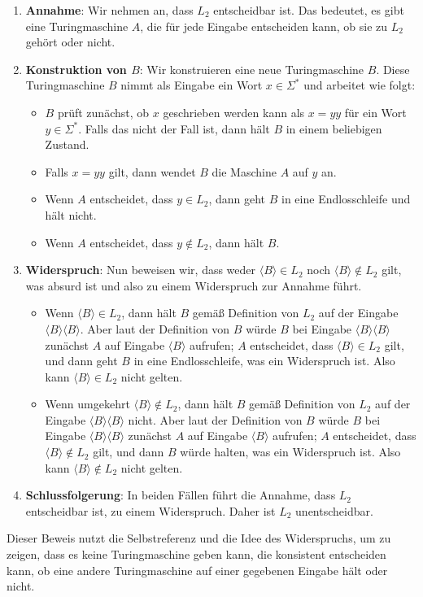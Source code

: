 \documentclass[a4paper,11pt,oneside,ngerman]{scrartcl}
\begin{document}
\begin{enumerate}
    \item \textbf{Annahme}: Wir nehmen an, dass \( L_2 \) entscheidbar ist. Das bedeutet, es gibt eine Turingmaschine \( A \), die für jede Eingabe entscheiden kann, ob sie zu \( L_2 \) gehört oder nicht.
    
    \item \textbf{Konstruktion von \( B \)}: Wir konstruieren eine neue Turingmaschine \( B \). Diese Turingmaschine \( B \) nimmt als Eingabe ein Wort $x\in\Sigma^\ast$ und arbeitet wie folgt:
    \begin{itemize}
        \item \(B\) prüft zunächst, ob \(x\) geschrieben werden kann als \(x=yy\) für ein Wort \(y\in\Sigma^\ast\). Falls das nicht der Fall ist, dann hält \(B\) in einem beliebigen Zustand.
        \item Falls \(x=yy\) gilt, dann wendet \( B \) die Maschine \( A \) auf \( y \) an.
        \item Wenn \( A \) entscheidet, dass \( y \in L_2 \), dann geht \( B \) in eine Endlosschleife und hält nicht.
        \item Wenn \( A \) entscheidet, dass \( y \notin L_2 \), dann hält \( B \).
    \end{itemize}
    
    \item \textbf{Widerspruch}: Nun beweisen wir, dass weder \( \langle B \rangle\in L_2 \) noch \( \langle B \rangle\not\in L_2 \) gilt, was absurd ist und also zu einem Widerspruch zur Annahme führt.
    \begin{itemize}
        \item Wenn \( \langle B \rangle \in L_2 \), dann hält \( B \) gemäß Definition von \(L_2\) auf der Eingabe \( \langle B \rangle\langle B \rangle \). Aber laut der Definition von \( B \) würde \(B\) bei Eingabe \(\langle B \rangle\langle B \rangle\) zunächst \(A\) auf Eingabe \(\langle B \rangle\) aufrufen; \(A\) entscheidet, dass \(\langle B \rangle\in L_2\) gilt, und dann geht \(B\) in eine Endlosschleife, was ein Widerspruch ist. Also kann \( \langle B \rangle \in L_2 \) nicht gelten.
        \item Wenn umgekehrt \( \langle B \rangle \notin L_2 \), dann hält \( B \) gemäß Definition von \(L_2\) auf der Eingabe \( \langle B \rangle\langle B \rangle \) nicht. Aber laut der Definition von \( B \) würde \(B\) bei Eingabe \(\langle B \rangle\langle B \rangle\) zunächst \(A\) auf Eingabe \(\langle B \rangle\) aufrufen; \(A\) entscheidet, dass \(\langle B \rangle\not\in L_2\) gilt, und dann \(B\) würde halten, was ein Widerspruch ist. Also kann \( \langle B \rangle \not\in L_2 \) nicht gelten.
    \end{itemize}
    
    \item \textbf{Schlussfolgerung}: In beiden Fällen führt die Annahme, dass \( L_2 \) entscheidbar ist, zu einem Widerspruch. Daher ist \( L_2 \) unentscheidbar.
\end{enumerate}

Dieser Beweis nutzt die Selbstreferenz und die Idee des Widerspruchs, um zu zeigen, dass es keine Turingmaschine geben kann, die konsistent entscheiden kann, ob eine andere Turingmaschine auf einer gegebenen Eingabe hält oder nicht.
\end{document}
